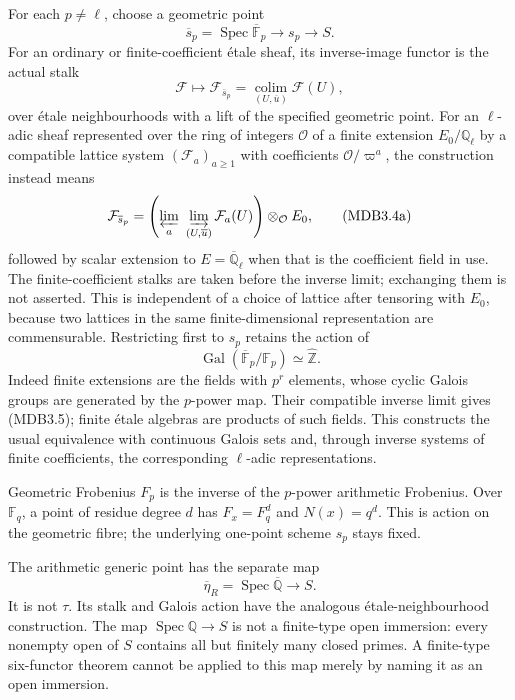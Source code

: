 \documentclass[
]{report}
\newcounter{none} %
\begin{document}
For each \(p\neq\ell\), choose a geometric point \[
\overline s_p=\operatorname{Spec}\overline{\mathbb F}_p\to s_p\to S.
\tag{MDB3.3}
\] For an ordinary or finite-coefficient étale sheaf, its inverse-image
functor is the actual stalk \[
\mathcal F\longmapsto\mathcal F_{\overline s_p}
=\underset{(U,\overline u)}{\operatorname{colim}}\mathcal F(U),
\tag{MDB3.4}
\] over étale neighbourhoods with a lift of the specified geometric
point. For an \(\ell\)-adic sheaf represented over the ring of integers
\(\mathcal O\) of a finite extension \(E_0/\mathbb Q_\ell\) by a
compatible lattice system \((\mathcal F_a)_{a\geq1}\) with coefficients
\(\mathcal O/\varpi^a\), the construction instead means \[
\mathcal F_{\overline s_p}
=\left(\varprojlim_a\ \varinjlim_{(U,\overline u)}\mathcal F_a(U)\right)
\otimes_{\mathcal O} E_0,
\tag{MDB3.4a}
\] followed by scalar extension to \(E=\overline{\mathbb Q}_\ell\) when
that is the coefficient field in use. The finite-coefficient stalks are
taken before the inverse limit; exchanging them is not asserted. This is
independent of a choice of lattice after tensoring with \(E_0\), because
two lattices in the same finite-dimensional representation are
commensurable. Restricting first to \(s_p\) retains the action of \[
\operatorname{Gal}(\overline{\mathbb F}_p/\mathbb F_p)\simeq\widehat{\mathbb Z}.
\tag{MDB3.5}
\] Indeed finite extensions are the fields with \(p^r\) elements, whose
cyclic Galois groups are generated by the \(p\)-power map. Their
compatible inverse limit gives (MDB3.5); finite étale algebras are
products of such fields. This constructs the usual equivalence with
continuous Galois sets and, through inverse systems of finite
coefficients, the corresponding \(\ell\)-adic representations.

Geometric Frobenius \(F_p\) is the inverse of the \(p\)-power arithmetic
Frobenius. Over \(\mathbb F_q\), a point of residue degree \(d\) has
\(F_x=F_q^d\) and \(N(x)=q^d\). This is action on the geometric fibre;
the underlying one-point scheme \(s_p\) stays fixed.

The arithmetic generic point has the separate map \[
\overline\eta_R=\operatorname{Spec}\overline{\mathbb Q}\to S.
\tag{MDB3.6}
\] It is not \(\tau\). Its stalk and Galois action have the analogous
étale-neighbourhood construction. The map
\(\operatorname{Spec}\mathbb Q\to S\) is not a finite-type open
immersion: every nonempty open of \(S\) contains all but finitely many
closed primes. A finite-type six-functor theorem cannot be applied to
this map merely by naming it as an open immersion.
\end{document}
